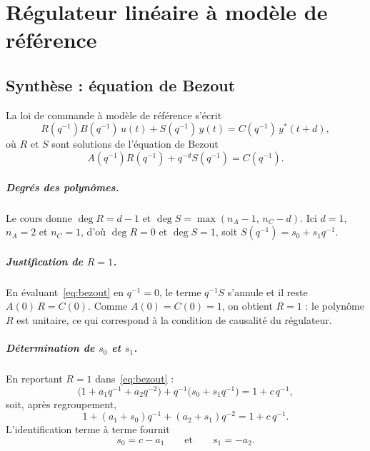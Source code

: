 \documentclass[11pt,a4paper]{report}
\begin{document}
\chapter{Régulateur linéaire à modèle de référence}

\section{Synthèse : équation de Bezout}

La loi de commande à modèle de référence s'écrit
\begin{equation}
  R(q^{-1})B(q^{-1})\,u(t) + S(q^{-1})\,y(t) = C(q^{-1})\,y^*(t+d),
  \label{eq:loiMR}
\end{equation}
où $R$ et $S$ sont solutions de l'équation de Bezout
\begin{equation}
  A(q^{-1})R(q^{-1}) + q^{-d} S(q^{-1}) = C(q^{-1}).
  \label{eq:bezout}
\end{equation}

\paragraph{Degrés des polynômes.} Le cours donne $\deg R = d - 1$ et
$\deg S = \max(n_A - 1,\, n_C - d)$. Ici $d = 1$, $n_A = 2$ et $n_C = 1$, d'où
$\deg R = 0$ et $\deg S = 1$, soit $S(q^{-1}) = s_0 + s_1 q^{-1}$.

\paragraph{Justification de $R = 1$.} En évaluant~\eqref{eq:bezout} en $q^{-1} = 0$, le terme
$q^{-1}S$ s'annule et il reste $A(0)\,R = C(0)$. Comme $A(0) = C(0) = 1$, on obtient $R = 1$ :
le polynôme $R$ est unitaire, ce qui correspond à la condition de causalité du régulateur.

\paragraph{Détermination de $s_0$ et $s_1$.} En reportant $R = 1$ dans~\eqref{eq:bezout} :
\begin{equation}
  \big(1 + a_1 q^{-1} + a_2 q^{-2}\big) + q^{-1}\big(s_0 + s_1 q^{-1}\big) = 1 + c\,q^{-1},
\end{equation}
soit, après regroupement,
\begin{equation}
  1 + (a_1 + s_0)q^{-1} + (a_2 + s_1)q^{-2} = 1 + c\,q^{-1}.
\end{equation}
L'identification terme à terme fournit
\begin{equation}
  \boxed{s_0 = c - a_1} \qquad\text{et}\qquad \boxed{s_1 = -a_2}.
\end{equation}
\end{document}

